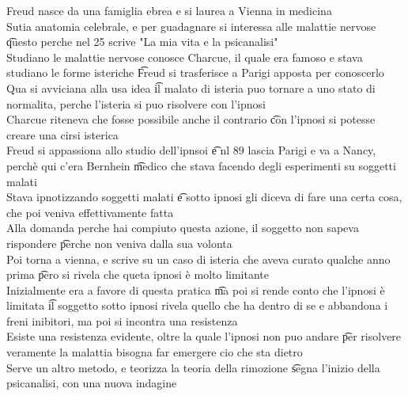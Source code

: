 \documentclass[12pt]{article}
\begin{document}
Freud nasce  da una famiglia ebrea e si laurea a Vienna in medicina \\
Sutia anatomia celebrale, e per guadagnare si interessa alle malattie nervose \t questo perche nel 25 scrive "La mia vita e la psicanalisi" \\
Studiano le malattie nervose conosce Charcue, il quale era famoso e stava studiano le forme isteriche \t Freud si trasferisce a Parigi apposta per conoscerlo \\
Qua si avviciana alla usa idea \t il malato di isteria puo tornare a uno stato di normalita, perche l'isteria si puo risolvere con l'ipnosi \\
Charcue riteneva che fosse possibile anche il contrario \t con l'ipnosi si potesse creare una cirsi isterica \\
Freud si appassiona allo studio dell'ipnsoi \t e nl 89 lascia Parigi e va a Nancy, perchè qui c'era Bernhein \t medico che stava facendo degli esperimenti su soggetti malati \\
Stava ipnotizzando soggetti malati \t e sotto ipnosi gli diceva di fare una certa cosa, che poi veniva effettivamente fatta \\
Alla domanda perche hai compiuto questa azione, il soggetto non sapeva rispondere \t perche non veniva dalla sua volonta \\
Poi torna a vienna, e scrive su un caso di isteria che aveva curato qualche anno prima \t pero si rivela che queta ipnosi è molto limitante \\
Inizialmente era a favore di questa pratica \t ma poi si rende conto che l'ipnosi è limitata \t il soggetto sotto ipnosi rivela quello che ha dentro di se e abbandona i freni inibitori, ma poi si incontra una resistenza \\
Esiste una resistenza evidente, oltre la quale l'ipnosi non puo andare \t per risolvere veramente la malattia bisogna far emergere cio che sta dietro \\
Serve un altro metodo, e teorizza la teoria della rimozione \t segna l'inizio della psicanalisi, con una nuova indagine
\end{document}
